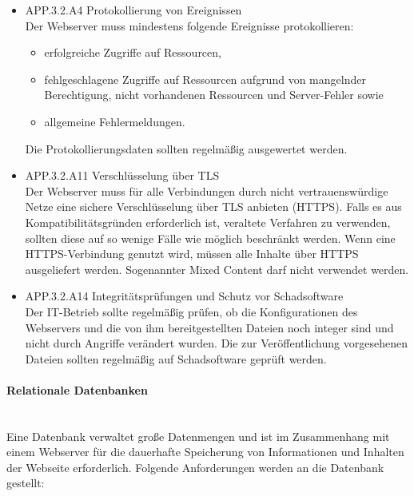 \begin{itemize}
      \item APP.3.2.A4 Protokollierung von Ereignissen\\
			Der Webserver muss mindestens folgende Ereignisse protokollieren:
\begin{itemize}
\item erfolgreiche Zugriffe auf Ressourcen,
\item fehlgeschlagene Zugriffe auf Ressourcen aufgrund von mangelnder Berechtigung, nicht vorhandenen Ressourcen und Server-Fehler sowie
\item allgemeine Fehlermeldungen.
\end{itemize}
Die Protokollierungsdaten sollten regelm\"a{\ss}ig ausgewertet werden.\cite{Grundschutz}\\
			
			\item APP.3.2.A11 Verschl\"usselung \"uber TLS\\
			Der Webserver muss f\"ur alle Verbindungen durch nicht vertrauensw\"urdige Netze eine sichere Verschl\"usselung \"uber \ac{TLS} anbieten (HTTPS). Falls es aus Kompatibilit\"atsgr\"unden erforderlich ist, veraltete Verfahren zu verwenden, sollten diese auf so wenige F\"alle wie m\"oglich beschr\"ankt werden. Wenn eine HTTPS-Verbindung genutzt wird, m\"ussen alle Inhalte \"uber HTTPS ausgeliefert werden. Sogenannter Mixed Content darf nicht verwendet werden.\cite{Grundschutz}\\
			
			\item APP.3.2.A14 Integrit\"atspr\"ufungen und Schutz vor Schadsoftware\\
			Der IT-Betrieb sollte regelm\"a{\ss}ig pr\"ufen, ob die Konfigurationen des Webservers und die von ihm bereitgestellten Dateien noch integer sind und nicht durch Angriffe ver\"andert wurden. Die zur Ver\"offentlichung vorgesehenen Dateien sollten regelm\"a{\ss}ig auf Schadsoftware gepr\"uft werden.\cite{Grundschutz}\\
						
   \end{itemize}  

\paragraph{Relationale Datenbanken}
\noindent \\Eine Datenbank verwaltet gro{\ss}e Datenmengen und ist im Zusammenhang mit einem Webserver f\"ur die dauerhafte Speicherung von Informationen und Inhalten der Webseite erforderlich. Folgende Anforderungen werden an die Datenbank gestellt:

